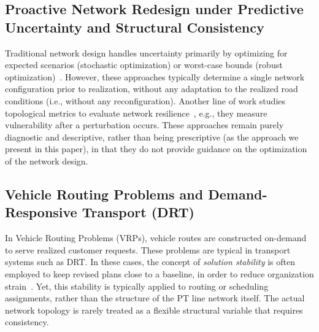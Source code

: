 \documentclass[a4paper,fleqn]{cas-sc}
\begin{document}
\subsection{Proactive Network Redesign under Predictive Uncertainty and Structural Consistency}
\label{sec:proactive}

Traditional network design handles uncertainty primarily by optimizing for expected scenarios (stochastic optimization) or worst-case bounds (robust optimization)~\citep{bertsimas2018data, wang2020robust}. 
However, these approaches typically determine a single network configuration prior to realization, without any adaptation to the realized road conditions (i.e., without any reconfiguration).
%
Another line of work studies topological metrics to evaluate network resilience~\citep{Massobrio2024, Pu2022}, e.g., they measure vulnerability after a perturbation occurs. These approaches remain purely diagnostic and descriptive, rather than being prescriptive (as the approach we present in this paper), in that they do not provide guidance on the optimization of the network design. 
%

%



\subsection{Vehicle Routing Problems and Demand-Responsive Transport (DRT)}
In Vehicle Routing Problems (VRPs), vehicle routes are constructed on-demand to serve realized customer requests. These problems are typical in transport systems such as DRT. In these cases, the concept of \emph{solution stability} is often employed to keep revised plans close to a baseline, in order to reduce organization strain~\citep{touzout2021modelling}. Yet, this stability is typically applied to routing or scheduling assignments, rather than the structure of the PT line network itself. The actual network topology is rarely treated as a flexible structural variable that requires consistency.
\end{document}
